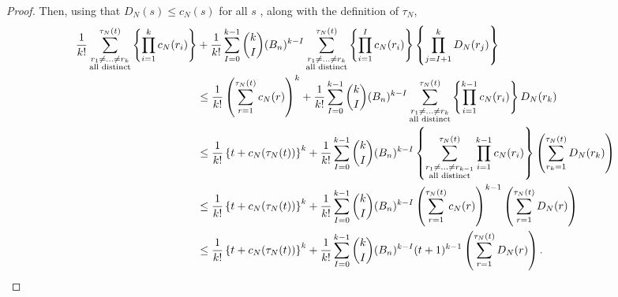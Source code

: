 \documentclass{article}
\newcommand{\1}[1]{\mathbbm{1}_{#1}}
\begin{document}
\begin{proof}
Then, using that $D_N(s) \leq c_N(s)$ for all $s$ \citep[p.9]{koskela2018}, along with the definition of $\tau_N$,
\begin{align}
\frac{1}{k!} \sum_{\substack{r_1\neq\dots\neq r_k \\\text{all distinct}}}^{\tau_N(t)} 
\left\{ \prod_{i=1}^{k} c_N(r_i) \right\} 
& + \frac{1}{k!}
\sum_{I=0}^{k-1}  \binom{k}{I}
( B_n )^{k-I}
\sum_{\substack{r_1\neq\dots\neq r_k \\\text{all distinct}}}^{\tau_N(t)} 
\left\{ \prod_{i=1}^{I} c_N(r_i) \right\} \left\{ \prod_{j=I+1}^k D_N(r_j) \right\}\notag\\
&\leq  \frac{1}{k!} \left( \sum_{r=1}^{\tau_N(t)} c_N(r) \right)^k
+ \frac{1}{k!}
\sum_{I=0}^{k-1}  \binom{k}{I}
( B_n )^{k-I}
\sum_{\substack{r_1\neq\dots\neq r_k \\\text{all distinct}}}^{\tau_N(t)} 
\left\{ \prod_{i=1}^{k-1} c_N(r_i) \right\} D_N(r_k) \notag\\
&\leq  \frac{1}{k!} \left\{ t + c_N(\tau_N(t)) \right\}^k
+ \frac{1}{k!}
\sum_{I=0}^{k-1}  \binom{k}{I}
( B_n )^{k-I}
\left\{ \sum_{\substack{r_1\neq\dots\neq r_{k-1} \\\text{all distinct}}}^{\tau_N(t)} 
\prod_{i=1}^{k-1} c_N(r_i) \right\} 
\left( \sum_{r_k =1}^{\tau_N(t)} D_N(r_k) \right) \notag\\
&\leq  \frac{1}{k!} \left\{ t + c_N(\tau_N(t)) \right\}^k
+ \frac{1}{k!}
\sum_{I=0}^{k-1}  \binom{k}{I}
( B_n )^{k-I}
\left( \sum_{r=1}^{\tau_N(t)} c_N(r) \right)^{k-1}
\left( \sum_{r=1}^{\tau_N(t)} D_N(r) \right) \notag\\
&\leq  \frac{1}{k!} \left\{ t + c_N(\tau_N(t)) \right\}^k
+ \frac{1}{k!}
\sum_{I=0}^{k-1}  \binom{k}{I}
( B_n )^{k-I}
(t+1)^{k-1}
\left( \sum_{r=1}^{\tau_N(t)} D_N(r) \right) . \label{eq:8}
\end{align}

\end{proof}
\end{document}

